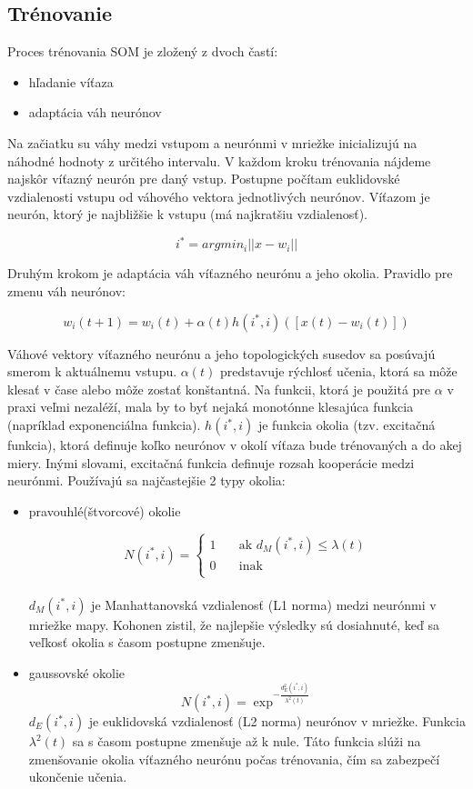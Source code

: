 \subsection{Trénovanie}
Proces trénovania SOM je zložený z dvoch častí:
\begin{itemize}
\item hľadanie víťaza
\item adaptácia váh neurónov
\end{itemize}
Na začiatku su váhy medzi vstupom a neurónmi v mriežke inicializujú na náhodné hodnoty z určitého intervalu.
V každom kroku trénovania nájdeme najskôr víťazný neurón pre daný vstup. Postupne počítam euklidovské vzdialenosti vstupu od váhového vektora jednotlivých neurónov. Víťazom je neurón, ktorý je najbližšie k vstupu (má najkratšiu vzdialenosť).

\begin{equation}
i^* = argmin_i||x-w_i|| 
\end{equation}

Druhým krokom je adaptácia váh víťazného neurónu a jeho okolia. Pravidlo pre zmenu váh neurónov:

\begin{equation}
w_i(t+1) = w_i(t) + \alpha(t)h(i^*, i)([x(t) - w_i(t)])
\end{equation}

Váhové vektory víťazného neurónu a jeho topologických susedov sa posúvajú smerom k aktuálnemu vstupu.
$\alpha(t)$ predstavuje rýchlosť učenia, ktorá sa môže klesať v čase alebo môže zostať konštantná. Na funkcii, ktorá je použitá pre $\alpha$ v praxi veľmi nezaléží, mala by to byť nejaká monotónne klesajúca funkcia (napríklad exponenciálna funkcia). 
$h(i^*, i)$ je funkcia okolia (tzv. excitačná funkcia), ktorá definuje koľko neurónov v okolí víťaza bude trénovaných a do akej miery. Inými slovami, excitačná funkcia definuje rozsah kooperácie medzi neurónmi. Používajú sa najčastejšie 2 typy okolia:
\begin{itemize}
\item pravouhlé(štvorcové) okolie

\[
N(i^{*},i) =
     \begin{cases}
       \text{1} &\quad\text{ak } d_{M}(i^*, i) \leq \lambda(t) \\
       \text{0} &\quad\text{inak}\\
     \end{cases}
\]
\\
$d_{M}(i^{*}, i)$ je Manhattanovská vzdialenosť (L1 norma) medzi neurónmi v mriežke mapy. Kohonen zistil, že najlepšie výsledky sú dosiahnuté, keď
sa veľkosť okolia s časom postupne zmenšuje.
\item gaussovské okolie
	\begin{equation}
		N(i^{*}, i) = \exp^{- \frac{d^{2}_{E}(i^{*}, i)}{\lambda^{2}(t)}}
	\end{equation}
$d_{E}(i^{*}, i)$ je euklidovská vzdialenosť (L2 norma) neurónov v mriežke. Funkcia $\lambda^2(t)$ sa s časom postupne zmenšuje až k nule. Táto
	funkcia slúži na zmenšovanie okolia víťazného neurónu počas trénovania, čím sa zabezpečí ukončenie učenia.
\end{itemize}

